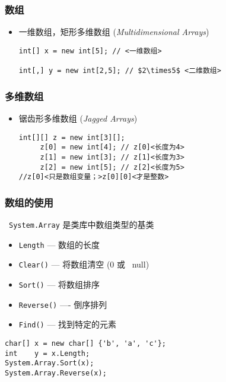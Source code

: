 \begin{frame}[fragile]
\frametitle{数组}
\begin{itemize}
\item 一维数组，矩形多维数组 (\textit{Multidimensional Arrays})
\begin{lstlisting}[escapeinside=<>,mathescape]
int[] x = new int[5]; // <一维数组>

int[,] y = new int[2,5]; // $2\times5$ <二维数组>
\end{lstlisting}
\end{itemize} \pause

  \begin{figure}[h] \label<1| handout:1>{fig:cs-array-mul} \centering
    
  \end{figure}
\end{frame}


\begin{frame}[fragile]
\frametitle{多维数组}
\begin{itemize}
\item 锯齿形多维数组 (\textit{Jagged Arrays})
\begin{lstlisting}[escapeinside=<>]
int[][] z = new int[3][];
     z[0] = new int[4]; // z[0]<长度为4>
     z[1] = new int[3]; // z[1]<长度为3>
     z[2] = new int[5]; // z[2]<长度为5>
//z[0]<只是数组变量；>z[0][0]<才是整数>

\end{lstlisting}
\end{itemize} \pause

  \begin{figure}[h] \label<1| handout:1>{fig:cs-array-rec}
    \centering 
  \end{figure}
\end{frame}

\begin{frame}[fragile]
\frametitle{数组的使用}
~\texttt{System.Array} 是类库中数组类型的基类

\begin{itemize}
\item \texttt{Length} --- 数组的长度
\item \texttt{Clear()} --- 将数组清空 (0 或 ~null)
\item \texttt{Sort()} --- 将数组排序
\item \texttt{Reverse()} ---- 倒序排列
\item \texttt{Find()} --- 找到特定的元素
\end{itemize}
\begin{lstlisting}
char[] x = new char[] {'b', 'a', 'c'};
int    y = x.Length;
System.Array.Sort(x);
System.Array.Reverse(x);
\end{lstlisting}

\end{frame}

